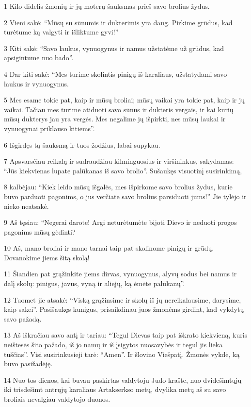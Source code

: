 \par 1 Kilo didelis žmonių ir jų moterų šauksmas prieš savo brolius žydus. 
\par 2 Vieni sakė: “Mūsų su sūnumis ir dukterimis yra daug. Pirkime grūdus, kad turėtume ką valgyti ir išliktume gyvi!” 
\par 3 Kiti sakė: “Savo laukus, vynuogynus ir namus užstatėme už grūdus, kad apsigintume nuo bado”. 
\par 4 Dar kiti sakė: “Mes turime skolintis pinigų iš karaliaus, užstatydami savo laukus ir vynuogynus. 
\par 5 Mes esame tokie pat, kaip ir mūsų broliai; mūsų vaikai yra tokie pat, kaip ir jų vaikai. Tačiau mes turime atiduoti savo sūnus ir dukteris vergais, ir kai kurių mūsų dukterys jau yra vergės. Mes negalime jų išpirkti, nes mūsų laukai ir vynuogynai priklauso kitiems”. 
\par 6 Išgirdęs tą šauksmą ir tuos žodžius, labai supykau. 
\par 7 Apsvarsčiau reikalą ir sudraudžiau kilminguosius ir viršininkus, sakydamas: “Jūs kiekvienas lupate palūkanas iš savo brolio”. Sušaukęs visuotinį susirinkimą, 
\par 8 kalbėjau: “Kiek leido mūsų išgalės, mes išpirkome savo brolius žydus, kurie buvo parduoti pagonims, o jūs verčiate savo brolius parsiduoti jums!” Jie tylėjo ir nieko neatsakė. 
\par 9 Aš tęsiau: “Negerai darote! Argi neturėtumėte bijoti Dievo ir neduoti progos pagonims mūsų gėdinti? 
\par 10 Aš, mano broliai ir mano tarnai taip pat skolinome pinigų ir grūdų. Dovanokime jiems šitą skolą! 
\par 11 Šiandien pat grąžinkite jiems dirvas, vynuogynus, alyvų sodus bei namus ir dalį skolų: pinigus, javus, vyną ir aliejų, ką ėmėte palūkanų”. 
\par 12 Tuomet jie atsakė: “Viską grąžinsime ir skolų iš jų nereikalausime, darysime, kaip sakei”. Pasišaukęs kunigus, prisaikdinau juos žmonėms girdint, kad vykdytų savo pažadą. 
\par 13 Aš iškračiau savo antį ir tariau: “Tegul Dievas taip pat iškrato kiekvieną, kuris neištesės šito pažado, iš jo namų ir iš įsigytos nuosavybės ir tegul jis lieka tuščias”. Visi susirinkusieji tarė: “Amen”. Ir šlovino Viešpatį. Žmonės vykdė, ką buvo pasižadėję. 
\par 14 Nuo tos dienos, kai buvau paskirtas valdytoju Judo krašte, nuo dvidešimtųjų iki trisdešimt antrųjų karaliaus Artakserkso metų, dvylika metų aš su savo broliais nevalgiau valdytojo duonos. 
